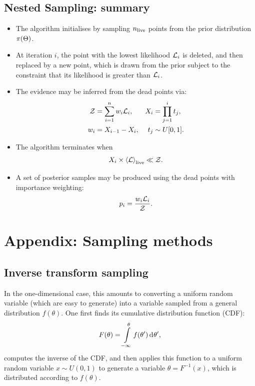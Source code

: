 \subsection{Nested Sampling: summary}
\label{sec:bay:comp_space}
\begin{itemize}
  \item The algorithm initialises by sampling $n_{\mathrm{live}}$ points from the prior distribution $\pi(\Theta)$. 
  \item At iteration $i$, the point with the lowest likelihood $\mathcal{L}_i$ is deleted, and then replaced by a new point, which is drawn from the prior subject to the constraint that its likelihood is greater than $\mathcal{L}_i$. 
  \item The evidence may be inferred from the dead points via:
    \begin{align}
      \mathcal{Z} &= \sum_{i=1}^n w_i \mathcal{L}_i, &
      X_i &= \prod_{j=1}^{i} t_j, \nonumber \\
      w_i &= X_{i-1}-X_{i},  & 
      t_j &\sim U[0,1].\nonumber 
    \end{align}
  \item The algorithm terminates when 
    \begin{equation}
      X_i \times {\left\langle{\mathcal{L}}\right\rangle}_{\mathrm{live}} \ll \mathcal{Z}.
    \end{equation}
  \item A set of posterior samples may be produced using the dead points with importance weighting:
    \begin{equation}
      p_i = \frac{w_i\mathcal{L}_i}{\mathcal{Z}}.\nonumber
    \end{equation}

\end{itemize}





\section{Appendix: Sampling methods}
\label{sec:app:sampling_methods}
\subsection{Inverse transform sampling}
\label{sec:sm:inverse_transform}

In the one-dimensional case, this amounts to converting a uniform random variable (which are easy to generate) into a variable sampled from a general distribution $f(\theta)$. One first finds its cumulative distribution function (CDF):
\begin{equation}
  F(\theta) = \int\limits_{-\infty}^\theta f(\theta^\prime) \operatorname{d}^{}\!{\theta^\prime},
\end{equation}
computes the inverse of the CDF, and then applies this function to a uniform random variable  $x\sim U(0,1)$ to generate a variable $\theta = F^{-1}(x)$, which is distributed according to $f(\theta)$. 

